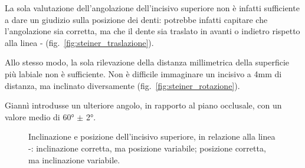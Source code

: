 La sola valutazione dell'angolazione dell'incisivo superiore non è infatti sufficiente a dare un giudizio sulla posizione dei denti: potrebbe infatti capitare che l'angolazione sia corretta, ma che il dente sia traslato in avanti o indietro rispetto alla linea - (fig.~\ref{fig:steiner_traslazione}).

Allo stesso modo, la sola rilevazione della distanza millimetrica della superficie più labiale non è sufficiente. Non è difficile immaginare un incisivo a 4mm di distanza, ma inclinato diversamente (fig.~\ref{fig:steiner_rotazione}).

Giannì introdusse un ulteriore angolo, in rapporto al piano occlusale, con un valore medio di 60° $\pm$ 2°.

\begin{figure}[p!]
 \quad
{}
 \centering
 \caption{Inclinazione e posizione dell'incisivo superiore, in relazione alla linea -:  inclinazione corretta, ma posizione variabile;  posizione corretta, ma inclinazione variabile.}
 \label{fig:steiner_incisivo_rototraslazione}
\end{figure}


